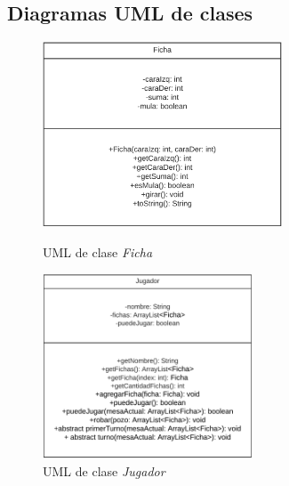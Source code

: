 \documentclass[12pt]{article}
\begin{document}
  \subsection{Diagramas UML de clases}
  \begin{figure}[h!]
    \centering
    \begin{minipage}[l]{0.45\textwidth}
      \centering
      \includegraphics[height=5.5cm]{uml1.png}
      \caption{UML de clase \textit{Ficha}}
    \end{minipage}
    \begin{minipage}[r]{0.45\textwidth}
      \centering
      \includegraphics[height=5.5cm]{uml2.png}
      \caption{UML de clase \textit{Jugador}}
    \end{minipage}
  \end{figure}
\end{document}

